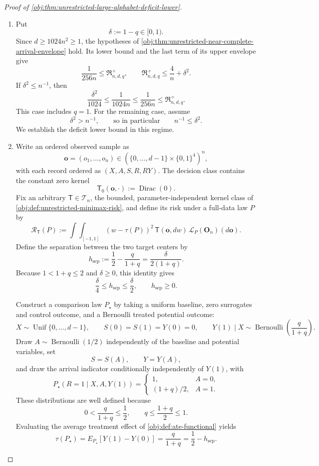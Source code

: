 \begin{proof}[Proof of \cref{obj:thm:unrestricted-large-alphabet-deficit-lower}]
\begin{enumerate}
\item Put
\[
\delta:=1-q\in[0,1).
\]
Since \(d\ge1024n^2\ge1\), the hypotheses of
\cref{obj:thm:unrestricted-near-complete-arrival-envelope} hold. Its lower bound and the last term of its upper envelope give
\[
\frac1{256n}\le\mathfrak R^{+}_{n,d,q},
\qquad
\mathfrak R^{+}_{n,d,q}\le\frac4n+\delta^2.
\]
If \(\delta^2\le n^{-1}\), then
\[
\frac{\delta^2}{1024}
\le\frac1{1024n}
\le\frac1{256n}
\le\mathfrak R^{+}_{n,d,q}.
\]
This case includes \(q=1\). For the remaining case, assume
\[
\delta^2>n^{-1},
\qquad\text{so in particular}\qquad n^{-1}\le\delta^2.
\]
We establish the deficit lower bound in this regime. %

\item Write an ordered observed sample as
\[
\mathbf o=(o_1,\ldots,o_n)
\in\left(\{0,\ldots,d-1\}\times\{0,1\}^4\right)^n,
\]
with each record ordered as \((X,A,S,R,RY)\). The decision class contains the constant zero kernel
\[
\mathsf T_0(\mathbf o,\cdot):=\operatorname{Dirac}(0).
\]
Fix an arbitrary \(\mathsf T\in\mathcal T_n\), the bounded, parameter-independent kernel class of
\cref{obj:def:unrestricted-minimax-risk}, and define its risk under a full-data law \(P\) by
\[
\mathcal R_{\mathsf T}(P)
:=
\int\!\int_{[-1,1]}
(w-\tau(P))^2\,
\mathsf T(\mathbf o,dw)\,
\mathcal L_P(\mathbf O_n)(d\mathbf o).
\]
Define the separation between the two target centers by
\[
h_{\mathrm{sep}}
:=\frac12-\frac q{1+q}
=\frac{\delta}{2(1+q)}.
\]
Because \(1<1+q\le2\) and \(\delta\ge0\), this identity gives
\[
\frac{\delta}{4}\le h_{\mathrm{sep}}\le\frac{\delta}{2},
\qquad h_{\mathrm{sep}}\ge0.
\]

Construct a comparison law \(P_\star\) by taking a uniform baseline, zero surrogates and control outcome, and a Bernoulli treated potential outcome:
\[
X\sim\operatorname{Unif}\{0,\ldots,d-1\},
\qquad
S(0)=S(1)=Y(0)=0,
\qquad
Y(1)\mid X\sim\operatorname{Bernoulli}\!\left(\frac q{1+q}\right).
\]
Draw \(A\sim\operatorname{Bernoulli}(1/2)\) independently of the baseline and potential variables, set
\[
S=S(A),\qquad Y=Y(A),
\]
and draw the arrival indicator conditionally independently of \(Y(1)\), with
\[
P_\star(R=1\mid X,A,Y(1))
=
\begin{cases}
1,&A=0,\\
(1+q)/2,&A=1.
\end{cases}
\]
These distributions are well defined because
\[
0<\frac q{1+q}\le\frac12,
\qquad
q\le\frac{1+q}{2}\le1.
\]
Evaluating the average treatment effect of
\cref{obj:def:ate-functional} yields
\[
\tau(P_\star)
=E_{P_\star}[Y(1)-Y(0)]
=\frac q{1+q}
=\frac12-h_{\mathrm{sep}}.
\]


\end{enumerate}
\end{proof}
